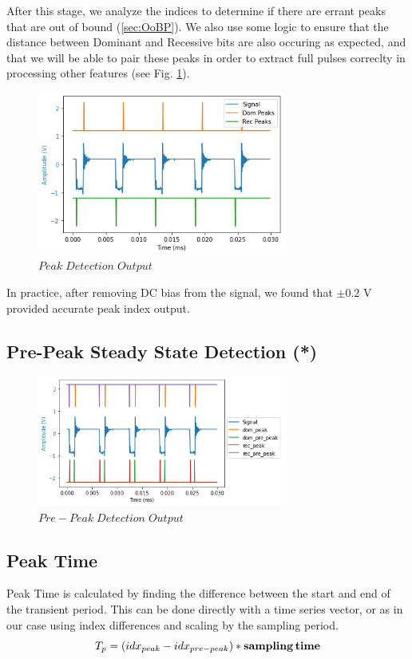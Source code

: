\documentclass[conference]{IEEEtran}
\begin{document}
After this stage, we analyze the indices to determine if there are errant peaks that are out of bound (\ref{sec:OoBP}). We also use some logic to ensure that the distance between Dominant and Recessive bits are also occuring as expected, and that we will be able to pair these peaks in order to extract full pulses correclty in processing other features (see Fig. \ref{fig:Peak}).

\begin{figure}[htb]
\centering
\includegraphics[width=3.2in]{figures/50_peak.png}
\caption{$Peak\;Detection\;Output$}
\label{fig:Peak}
\end{figure}

In practice, after removing DC bias from the signal, we found that $\pm 0.2$ V provided accurate peak index output.

\subsection{Pre-Peak Steady State Detection (*)}
\begin{figure}[htb]
\centering
\includegraphics[width=3.2in]{figures/51_prepeak.png}
\caption{$Pre-Peak\;Detection\;Output$}
\label{fig:Prepeak}
\end{figure}

\subsection{Peak Time}
Peak Time is calculated by finding the difference between the start and end of the transient period. This can be done directly with a time series vector, or as in our case using index differences and scaling by the sampling period.
\begin{equation*}
T_p = (idx_{peak} - idx_{pre-peak}) * \textbf{sampling\,time}   
\end{equation*}
\end{document}
